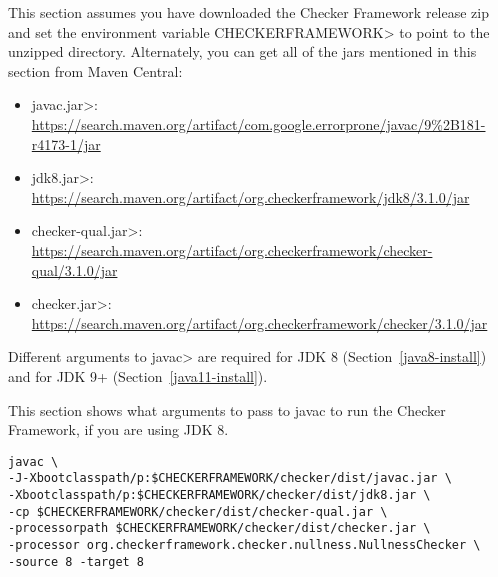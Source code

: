 This
section assumes you have downloaded the Checker Framework release zip and set
the environment variable \<CHECKERFRAMEWORK> to point to the unzipped directory.
Alternately, you can get all of the jars mentioned in this section from Maven Central:

\begin{itemize}
\item \<javac.jar>: \url{https://search.maven.org/artifact/com.google.errorprone/javac/9%2B181-r4173-1/jar}
\item \<jdk8.jar>: \url{https://search.maven.org/artifact/org.checkerframework/jdk8/3.1.0/jar}
\item \<checker-qual.jar>: \url{https://search.maven.org/artifact/org.checkerframework/checker-qual/3.1.0/jar}
\item \<checker.jar>: \url{https://search.maven.org/artifact/org.checkerframework/checker/3.1.0/jar}
\end{itemize}

Different arguments to \<javac> are required for JDK 8
(Section~\ref{java8-install}) and for JDK 9+ (Section~\ref{java11-install}).



This section shows what arguments to pass to javac to run the Checker
Framework, if you are using JDK 8.

\begin{Verbatim}
javac \
-J-Xbootclasspath/p:$CHECKERFRAMEWORK/checker/dist/javac.jar \
-Xbootclasspath/p:$CHECKERFRAMEWORK/checker/dist/jdk8.jar \
-cp $CHECKERFRAMEWORK/checker/dist/checker-qual.jar \
-processorpath $CHECKERFRAMEWORK/checker/dist/checker.jar \
-processor org.checkerframework.checker.nullness.NullnessChecker \
-source 8 -target 8
\end{Verbatim}

